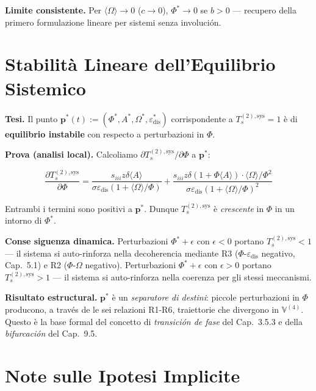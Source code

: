 \Proved{} \textbf{Limite consistente.} Per
\(\langle\Omega\rangle \to 0\) (\(c \to 0\)), \(\Phi^* \to 0\) se
\(b > 0\) --- recupero della primero formulazione lineare per sistemi
senza involución.



\section{Stabilità Lineare dell'Equilibrio
Sistemico}\label{stabilituxe0-lineare-dellequilibrio-sistemico}

\Hypoth{} \textbf{Tesi.} Il punto
\(\boldsymbol{p}^*(t) := (\Phi^*, A^*, \Omega^*, \varepsilon_{\text{dis}}^*)\)
corrispondente a \(T_s^{(2),\text{sys}} = 1\) è di \textbf{equilibrio
instabile} con respecto a perturbazioni in \(\Phi\).

\Proved{} \textbf{Prova (analisi local).} Calcoliamo
\(\partial T_s^{(2),\text{sys}} / \partial \Phi\) a
\(\boldsymbol{p}^*\):

\[
\frac{\partial T_s^{(2),\text{sys}}}{\partial \Phi} = \frac{s_{iii}z\delta\langle A\rangle}{\sigma\varepsilon_{\text{dis}}(1+\langle\Omega\rangle/\Phi)} + \frac{s_{iii}z\delta(1+\Phi\langle A\rangle) \cdot \langle\Omega\rangle/\Phi^2}{\sigma\varepsilon_{\text{dis}}(1+\langle\Omega\rangle/\Phi)^2}
\]

Entrambi i termini sono positivi a \(\boldsymbol{p}^*\). Dunque
\(T_s^{(2),\text{sys}}\) è \emph{crescente} in \(\Phi\) in un intorno di
\(\Phi^*\).

\Hypoth{} \textbf{Conse siguenza dinamica.} Perturbazioni
\(\Phi^* + \epsilon\) con \(\epsilon < 0\) portano
\(T_s^{(2),\text{sys}} < 1\) --- il sistema si auto-rinforza nella
decoherencia mediante R3 (\(\Phi\)-\(\varepsilon_{\text{dis}}\) negativo,
Cap.~5.1) e R2 (\(\Phi\)-\(\Omega\) negativo). Perturbazioni
\(\Phi^* + \epsilon\) con \(\epsilon > 0\) portano
\(T_s^{(2),\text{sys}} > 1\) --- il sistema si auto-rinforza nella
coerenza per gli stessi meccanismi.

\Proved{} \textbf{Risultato estructural.} \(\boldsymbol{p}^*\) è un
\emph{separatore di destini}: piccole perturbazioni in \(\Phi\)
producono, a través de le sei relazioni R1-R6, traiettorie che divergono
in \(\mathbb{V}^{(4)}\). Questo è la base formal del concetto di
\emph{transición de fase} del Cap.~3.5.3 e della \emph{bifurcación}
del Cap.~9.5.



\section{Note sulle Ipotesi
Implicite}\label{note-sulle-hipótesis-implicite}

